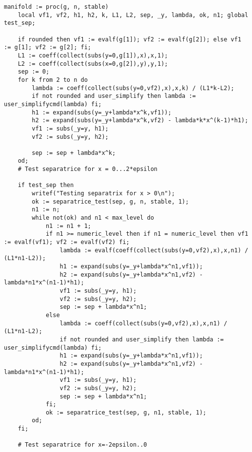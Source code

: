 \documentclass[a4paper,10pt]{article}
\begin{document}
\begin{lstlisting}[name=type]
manifold := proc(g, n, stable)
    local vf1, vf2, h1, h2, k, L1, L2, sep, _y, lambda, ok, n1; global test_sep;

    if rounded then vf1 := evalf(g[1]); vf2 := evalf(g[2]); else vf1 := g[1]; vf2 := g[2]; fi;
    L1 := coeff(collect(subs(y=0,g[1]),x),x,1);
    L2 := coeff(collect(subs(x=0,g[2]),y),y,1);
    sep := 0;
    for k from 2 to n do
        lambda := coeff(collect(subs(y=0,vf2),x),x,k) / (L1*k-L2);
        if not rounded and user_simplify then lambda := user_simplifycmd(lambda) fi;
        h1 := expand(subs(y=_y+lambda*x^k,vf1));
        h2 := expand(subs(y=_y+lambda*x^k,vf2) - lambda*k*x^(k-1)*h1);
        vf1 := subs(_y=y, h1);
        vf2 := subs(_y=y, h2);

        sep := sep + lambda*x^k;
    od;
    # Test separatrice for x = 0...2*epsilon

    if test_sep then
        writef("Testing separatrix for x > 0\n");
        ok := separatrice_test(sep, g, n, stable, 1);
        n1 := n;
        while not(ok) and n1 < max_level do
            n1 := n1 + 1;
            if n1 >= numeric_level then if n1 = numeric_level then vf1 := evalf(vf1); vf2 := evalf(vf2) fi;
                lambda := evalf(coeff(collect(subs(y=0,vf2),x),x,n1) / (L1*n1-L2));
                h1 := expand(subs(y=_y+lambda*x^n1,vf1));
                h2 := expand(subs(y=_y+lambda*x^n1,vf2) - lambda*n1*x^(n1-1)*h1);
                vf1 := subs(_y=y, h1);
                vf2 := subs(_y=y, h2);
                sep := sep + lambda*x^n1;
            else
                lambda := coeff(collect(subs(y=0,vf2),x),x,n1) / (L1*n1-L2);
                if not rounded and user_simplify then lambda := user_simplifycmd(lambda) fi;
                h1 := expand(subs(y=_y+lambda*x^n1,vf1));
                h2 := expand(subs(y=_y+lambda*x^n1,vf2) - lambda*n1*x^(n1-1)*h1);
                vf1 := subs(_y=y, h1);
                vf2 := subs(_y=y, h2);
                sep := sep + lambda*x^n1;
            fi;
            ok := separatrice_test(sep, g, n1, stable, 1);
        od;
    fi;

    # Test separatrice for x=-2epsilon..0


\end{lstlisting}
\end{document}
